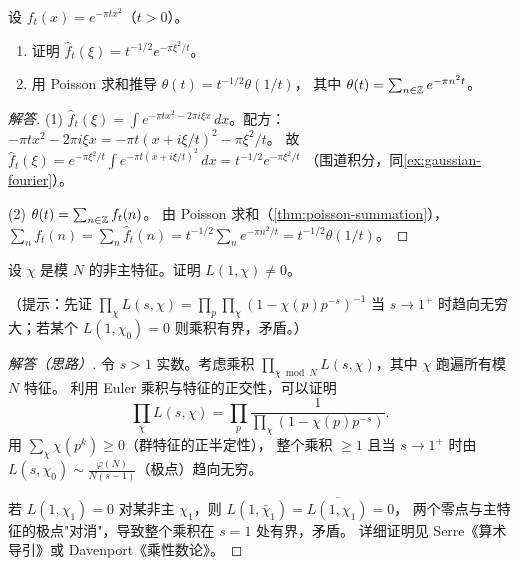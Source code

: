 \begin{exercise}
\label{ex:ch2-poisson-gaussian}
设 $f_t(x) = e^{-\pi t x^2}$（$t > 0$）。
\begin{enumerate}
  \item 证明 $\hat{f}_t(\xi) = t^{-1/2} e^{-\pi\xi^2/t}$。
  \item 用 Poisson 求和推导 $\theta(t) = t^{-1/2}\theta(1/t)$，
    其中 $\theta(t) = \sum_{n \in \mathbb{Z}} e^{-\pi n^2 t}$。
\end{enumerate}
\end{exercise}

\begin{proof}[解答]
(1) $\hat{f}_t(\xi) = \int e^{-\pi tx^2 - 2\pi i\xi x}\,dx$。配方：
$-\pi t x^2 - 2\pi i\xi x = -\pi t(x + i\xi/t)^2 - \pi\xi^2/t$。
故 $\hat{f}_t(\xi) = e^{-\pi\xi^2/t} \int e^{-\pi t(x+i\xi/t)^2}\,dx = t^{-1/2} e^{-\pi\xi^2/t}$
（围道积分，同\cref{ex:gaussian-fourier}）。

(2) $\theta(t) = \sum_{n \in \mathbb{Z}} f_t(n)$。
由 Poisson 求和（\cref{thm:poisson-summation}），
$\sum_n f_t(n) = \sum_n \hat{f}_t(n) = t^{-1/2}\sum_n e^{-\pi n^2/t} = t^{-1/2}\theta(1/t)$。
\end{proof}

\begin{exercise}
\label{ex:ch2-dirichlet-L-s1}
设 $\chi$ 是模 $N$ 的非主特征。证明 $L(1,\chi) \neq 0$。

（提示：先证 $\prod_\chi L(s,\chi) = \prod_p \prod_\chi (1 - \chi(p)p^{-s})^{-1}$
当 $s \to 1^+$ 时趋向无穷大；若某个 $L(1,\chi_0^{}) = 0$ 则乘积有界，矛盾。）
\end{exercise}

\begin{proof}[解答（思路）]
令 $s > 1$ 实数。考虑乘积
$\prod_{\chi \bmod N} L(s, \chi)$，其中 $\chi$ 跑遍所有模 $N$ 特征。
利用 Euler 乘积与特征的正交性，可以证明
\[
  \prod_{\chi} L(s, \chi) = \prod_{p} \frac{1}{\prod_\chi(1 - \chi(p)p^{-s})}.
\]
用 $\sum_\chi \chi(p^k) \geq 0$（群特征的正半定性），
整个乘积 $\geq 1$ 且当 $s \to 1^+$ 时由 $L(s, \chi_0) \sim \frac{\varphi(N)}{N(s-1)}$（极点）趋向无穷。

若 $L(1, \chi_1) = 0$ 对某非主 $\chi_1$，则 $L(1, \bar\chi_1) = \overline{L(1,\chi_1)} = 0$，
两个零点与主特征的极点"对消"，导致整个乘积在 $s = 1$ 处有界，矛盾。
详细证明见 Serre《算术导引》或 Davenport《乘性数论》。
\end{proof}
